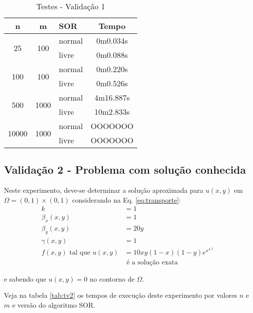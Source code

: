 \documentclass[
	11pt,				%
	oneside,			%
	a4paper,			%
	english,			%
	brazil,				%
	]{article}
\begin{document}
\begin{table}[ht]
\centering
\begin{tabular}{|c|c|l|c|}
\hline 
\textbf{n} & \textbf{m} & \textbf{SOR} & \textbf{Tempo} \\
\hline
\multirow{2}{*}{25}    & \multirow{2}{*}{100}  & normal & 0m0.034s \\
                       &                       & livre  & 0m0.088s \\
\hline
\multirow{2}{*}{100}   & \multirow{2}{*}{100}  & normal & 0m0.220s \\
                       &                       & livre  & 0m0.526s \\
\hline
\multirow{2}{*}{500}   & \multirow{2}{*}{1000} & normal & 4m16.887s \\
                       &                       & livre  & 10m2.833s \\
\hline
\multirow{2}{*}{10000} & \multirow{2}{*}{1000} & normal & OOOOOOO \\
                       &                       & livre  & OOOOOOO \\
\hline
\end{tabular}
\caption{Testes - Validação 1}
\label{tab:tv1}
\end{table}

\subsection{Validação 2 - Problema com solução conhecida}
Neste experimento, deve-se determinar a solução aproximada para $u(x,y)$ em 
$\Omega = (0,1) \times (0,1)$ considerando na Eq.
\eqref{eq:transporte}:
\begin{align}\label{eq:v2}
k &= 1\nonumber \\
\beta_x(x,y) &= 1\nonumber \\
\beta_y(x,y) &= 20y\nonumber \\
\gamma(x,y) &= 1\nonumber \\
f(x,y) \text{ tal que } u(x,y) &= 10xy(1-x)(1-y)e^{x^{4.5}}\\
&\text{ é a solução exata }\nonumber
\end{align}

e sabendo que $u(x,y) = 0$ no contorno de $\Omega$.

Veja na tabela \ref{tab:tv2} os tempos de execução deste experimento por 
valores $n$ e $m$ e versão do algoritmo SOR.
\end{document}
